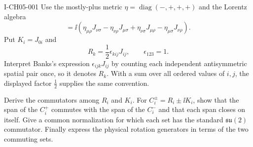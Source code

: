 \begin{exercise}{I-CH05-001}
Use the mostly-plus metric $\eta=\operatorname{diag}(-,+,+,+)$ and the Lorentz algebra
\begin{equation*}
  [J_{\mu\nu},J_{\rho\sigma}]
  =\ii\left(
    \eta_{\mu\rho}J_{\nu\sigma}
    -\eta_{\nu\rho}J_{\mu\sigma}
    +\eta_{\nu\sigma}J_{\mu\rho}
    -\eta_{\mu\sigma}J_{\nu\rho}
  \right).
\end{equation*}
Put $K_i=J_{0i}$ and
\begin{equation*}
  R_k=\frac12\epsilon_{kij}J_{ij},
  \qquad \epsilon_{123}=1.
\end{equation*}
Interpret Banks's expression $\epsilon_{ijk}J_{ij}$ by counting each
independent antisymmetric spatial pair once, so it denotes $R_k$.  With a sum
over all ordered values of $i,j$, the displayed factor $\frac12$ supplies the
same convention.

Derive the commutators among $R_i$ and $K_i$.  For
$C_i^\pm=R_i\pm\ii K_i$, show that the span of the $C_i^+$ commutes with the
span of the $C_i^-$ and that each span closes on itself.  Give a common
normalization for which each set has the standard $\mathfrak{su}(2)$
commutator.  Finally express the physical rotation generators in terms of the
two commuting sets.
\end{exercise}
